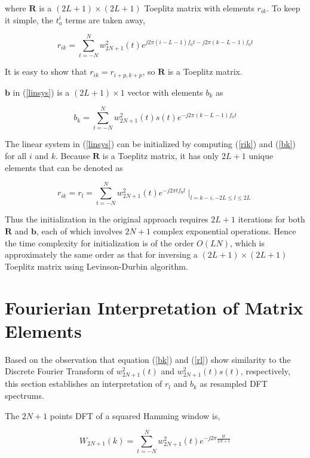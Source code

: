 \documentclass[dvips]{article}
\newcommand{\matr}[1]{\mathbf{#1}}
\begin{document}
where $\matr{R}$ is a $(2L + 1) \times (2L + 1)$ Toeplitz matrix with elements $r_{ik}$. To keep it simple, the $t^i_a$ terms are taken away,

\begin{equation} \label{rik}
r_{ik} = \sum_{t = -N}^{N} w_{2N + 1}^2(t) e^{j 2\pi (i - L - 1) f_0 t - j 2\pi (k - L - 1) f_0 t}
\end{equation}

It is easy to show that $r_{ik} = r_{i+p, k+p}$, so $\matr{R}$ is a Toeplitz matrix.

$\matr{b}$ in (\ref{linsys}) is a $(2L + 1) \times 1$ vector with elements $b_k$ as

\begin{equation} \label{bk}
b_k = \sum_{t = -N}^{N} w_{2N + 1}^2(t) s(t) e^{-j 2\pi (k - L - 1)f_0 t}
\end{equation}

The linear system in (\ref{linsys}) can be initialized by computing (\ref{rik}) and (\ref{bk}) for all $i$ and $k$. Because $\matr{R}$ is a Toeplitz matrix, it has only $2L + 1$ unique elements that can be denoted as

\begin{equation} \label{rl}
r_{ik} = r_l = \sum_{t = -N}^{N} w_{2N + 1}^2(t) e^{-j 2\pi t f_0 l} \mid_{l = k - i, -2L \leq l \leq 2L}
\end{equation}

Thus the initialization in the original approach requires $2L + 1$ iterations for both $\matr{R}$ and $\matr{b}$, each of which involves $2N + 1$ complex exponential operations. Hence the time complexity for initialization is of the order $O(LN)$, which is approximately the same order as that for inversing a $(2L + 1) \times (2L + 1)$ Toeplitz matrix using Levinson-Durbin algorithm.

\section{Fourierian Interpretation of Matrix Elements}

Based on the observation that equation (\ref{bk}) and (\ref{rl}) show similarity to the Discrete Fourier Transform of $w^2_{2N + 1}(t)$ and $w^2_{2N + 1}(t)s(t)$, respectively, this section establishes an interpretation of $r_l$ and $b_k$ as resampled DFT spectrums.

The $2N + 1$ points DFT of a squared Hamming window is,

\begin{equation} \label{dftsqhamm}
W_{2N + 1}(k) = \sum_{t = -N}^{N} w^2_{2N + 1}(t) e^{-j 2\pi \frac{kt}{2N + 1}}
\end{equation}
\end{document}
